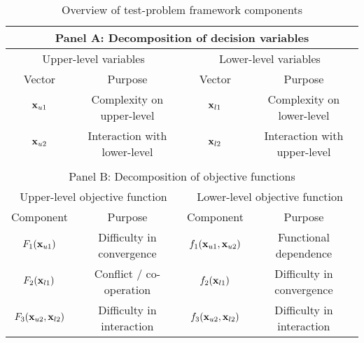 \documentclass[twoside]{article}
\begin{document}
\begin{table*}
\caption{Overview of test-problem framework components}\label{tab:framework}
\begin{minipage}{1.0\linewidth}
\begin{footnotesize}
\begin{center}
\begin{tabular}{|c|c|c|c|}
\multicolumn{4}{c}{Panel A: Decomposition of decision variables}\\
\hline
\multicolumn{2}{|c|}{Upper-level variables} & \multicolumn{2}{|c|}{Lower-level variables} \\
\hline
Vector & Purpose & Vector & Purpose \\
\hline\hline
$\mbox{$\mathbf{x}$}_{u1}$ & Complexity on upper-level & $\mbox{$\mathbf{x}$}_{l1}$ & Complexity on lower-level \\
$\mbox{$\mathbf{x}$}_{u2}$ & Interaction with lower-level & $\mbox{$\mathbf{x}$}_{l2}$ & Interaction with upper-level \\
\hline

\multicolumn{4}{c}{}\\

\multicolumn{4}{c}{Panel B: Decomposition of objective functions}\\
\hline
\multicolumn{2}{|c|}{Upper-level objective function} & \multicolumn{2}{|c|}{Lower-level objective function} \\
\hline
Component & Purpose & Component & Purpose \\
\hline\hline
 $F_1(\mbox{$\mathbf{x}$}_{u1})$& Difficulty in convergence & $f_1(\mbox{$\mathbf{x}$}_{u1}, \mbox{$\mathbf{x}$}_{u2})$ & Functional dependence \\
 $F_2(\mbox{$\mathbf{x}$}_{l1})$& Conflict / co-operation & $f_2(\mbox{$\mathbf{x}$}_{l1})$ & Difficulty in convergence\\
 $F_3(\mbox{$\mathbf{x}$}_{u2},\mbox{$\mathbf{x}$}_{l2})$& Difficulty in interaction & $f_3(\mbox{$\mathbf{x}$}_{u2},\mbox{$\mathbf{x}$}_{l2})$ & Difficulty in interaction \\
\hline
\end{tabular}
\end{center}
\end{footnotesize}
\end{minipage}
\end{table*}
\end{document}
